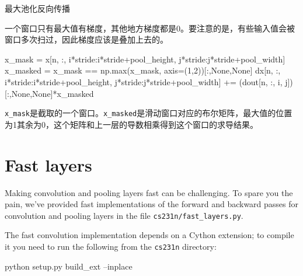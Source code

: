 \documentclass[11pt]{article}
\newenvironment{Shaded}{}{}
\newcommand{\DecValTok}[1]{\textcolor[rgb]{0.25,0.63,0.44}{{#1}}}
\newcommand{\NormalTok}[1]{{#1}}
\newcommand{\VariableTok}[1]{\textcolor[rgb]{0.10,0.09,0.49}{{#1}}}
\newcommand{\OperatorTok}[1]{\textcolor[rgb]{0.40,0.40,0.40}{{#1}}}
\newcommand{\BuiltInTok}[1]{{#1}}
\newcommand{\ExtensionTok}[1]{{#1}}
\begin{document}
    最大池化反向传播

一个窗口只有最大值有梯度，其他地方梯度都是0。要注意的是，有些输入值会被窗口多次扫过，因此梯度应该是叠加上去的。

\begin{Shaded}
\begin{Highlighting}[]
\NormalTok{x_mask }\OperatorTok{=}\NormalTok{ x[n, :, i}\OperatorTok{*}\NormalTok{stride:i}\OperatorTok{*}\NormalTok{stride}\OperatorTok{+}\NormalTok{pool_height, j}\OperatorTok{*}\NormalTok{stride:j}\OperatorTok{*}\NormalTok{stride}\OperatorTok{+}\NormalTok{pool_width]}
\NormalTok{x_masked }\OperatorTok{=}\NormalTok{ x_mask }\OperatorTok{==}\NormalTok{ np.}\BuiltInTok{max}\NormalTok{(x_mask, axis}\OperatorTok{=}\NormalTok{(}\DecValTok{1}\NormalTok{,}\DecValTok{2}\NormalTok{))[:,}\VariableTok{None}\NormalTok{,}\VariableTok{None}\NormalTok{]}
\NormalTok{dx[n, :, i}\OperatorTok{*}\NormalTok{stride:i}\OperatorTok{*}\NormalTok{stride}\OperatorTok{+}\NormalTok{pool_height, j}\OperatorTok{*}\NormalTok{stride:j}\OperatorTok{*}\NormalTok{stride}\OperatorTok{+}\NormalTok{pool_width] }\OperatorTok{+=}\NormalTok{ (dout[n, :, i, j])[:,}\VariableTok{None}\NormalTok{,}\VariableTok{None}\NormalTok{]}\OperatorTok{*}\NormalTok{x_masked}
\end{Highlighting}
\end{Shaded}


\texttt{x\_mask}是截取的一个窗口。\texttt{x\_masked}是滑动窗口对应的布尔矩阵，最大值的位置为1其余为0，这个矩阵和上一层的导数相乘得到这个窗口的求导结果。

    \hypertarget{fast-layers}{%
\section{Fast layers}\label{fast-layers}}

Making convolution and pooling layers fast can be challenging. To spare
you the pain, we've provided fast implementations of the forward and
backward passes for convolution and pooling layers in the file
\texttt{cs231n/fast\_layers.py}.

The fast convolution implementation depends on a Cython extension; to
compile it you need to run the following from the \texttt{cs231n}
directory:

\begin{Shaded}
\begin{Highlighting}[]
\ExtensionTok{python}\NormalTok{ setup.py build_ext --inplace}
\end{Highlighting}
\end{Shaded}
\end{document}
